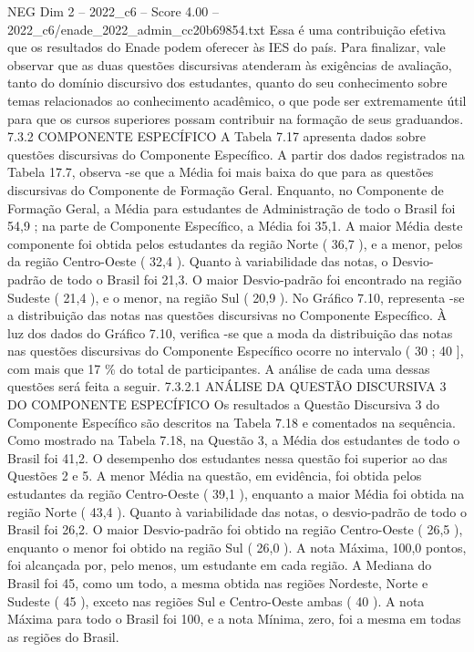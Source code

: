 \begin{textsample}{NEG Dim 2 – 2022\_c6 – Score 4.00 – 2022\_c6/enade\_2022\_admin\_cc20b69854.txt}
Essa é uma contribuição efetiva que os resultados do Enade podem oferecer às IES do país.
Para finalizar, vale observar que as duas questões discursivas atenderam às exigências de avaliação, tanto do domínio discursivo dos estudantes, quanto do seu conhecimento sobre temas relacionados ao conhecimento acadêmico, o que pode ser extremamente útil para que os cursos superiores possam contribuir na formação de seus graduandos. 7.3.2 COMPONENTE ESPECÍFICO A Tabela 7.17 apresenta dados sobre questões discursivas do Componente Específico.
A partir dos dados registrados na Tabela 17.7, observa -se que a Média foi mais baixa do que para as questões discursivas do Componente de Formação Geral.
Enquanto, no Componente de Formação Geral, a Média para estudantes de Administração de todo o Brasil foi 54,9 ; na parte de Componente Específico, a Média foi 35,1.
A maior Média deste componente foi obtida pelos estudantes da região Norte ( 36,7 ), e a menor, pelos da região Centro-Oeste ( 32,4 ).
Quanto à variabilidade das notas, o Desvio-padrão de todo o Brasil foi 21,3.
O maior Desvio-padrão foi encontrado na região Sudeste ( 21,4 ), e o menor, na região Sul ( 20,9 ).
No Gráfico 7.10, representa -se a distribuição das notas nas questões discursivas no Componente Específico.
À luz dos dados do Gráfico 7.10, verifica -se que a moda da distribuição das notas nas questões discursivas do Componente Específico ocorre no intervalo ( 30 ; 40 ], com mais que 17 \% do total de participantes.
A análise de cada uma dessas questões será feita a seguir. 7.3.2.1 ANÁLISE DA QUESTÃO DISCURSIVA 3 DO COMPONENTE ESPECÍFICO Os resultados a Questão Discursiva 3 do Componente Específico são descritos na Tabela 7.18 e comentados na sequência.
Como mostrado na Tabela 7.18, na Questão 3, a Média dos estudantes de todo o Brasil foi 41,2.
O desempenho dos estudantes nessa questão foi superior ao das Questões 2 e 5.
A menor Média na questão, em evidência, foi obtida pelos estudantes da região Centro-Oeste ( 39,1 ), enquanto a maior Média foi obtida na região Norte ( 43,4 ).
Quanto à variabilidade das notas, o desvio-padrão de todo o Brasil foi 26,2.
O maior Desvio-padrão foi obtido na região Centro-Oeste ( 26,5 ), enquanto o menor foi obtido na região Sul ( 26,0 ).
A nota Máxima, 100,0 pontos, foi alcançada por, pelo menos, um estudante em cada região.
A Mediana do Brasil foi 45, como um todo, a mesma obtida nas regiões Nordeste, Norte e Sudeste ( 45 ), exceto nas regiões Sul e Centro-Oeste ambas ( 40 ).
A nota Máxima para todo o Brasil foi 100, e a nota Mínima, zero, foi a mesma em todas as regiões do Brasil.

\end{textsample}
